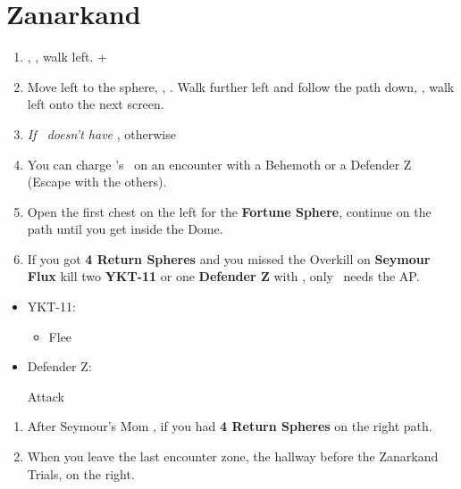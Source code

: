 \chapter{Zanarkand}
\begin{enumerate}
    \item \sd, \cs[0:50], walk left. \fmv+\cs[2:20]
    \item Move left to the sphere, \sd, \cs[1:40]. Walk further left and follow the path down, \cs[3:20], walk left onto the next screen.
    \item \textit{If \rikku\ doesn't have \od} \formation{\tidus}{\auron}{\rikku}, otherwise \formation{\tidus}{\auron}{\kimahri}
    \item You can charge \rikku's \od\ on an encounter with a Behemoth or a Defender Z (Escape with the others).
    \item Open the first chest on the left for the \textbf{Fortune Sphere}, continue on the path until you get inside the Dome.
    \item If you got \textbf{4 Return Spheres} and you missed the Overkill on \textbf{Seymour Flux} kill two \textbf{YKT-11} or one \textbf{Defender Z} with \formation{\tidus}{\auron}{\yuna}, only \yuna\ needs the AP.
\end{enumerate}
\begin{encounters}
    \begin{itemize}
        \item YKT-11:
        \begin{itemize}
            \yunaf Attack
            \tidusf Attack
            \item Flee
        \end{itemize}
        \item Defender Z:
        \begin{itemize}
            \summon{\bahamut}
            \bahamutf Attack
        \end{itemize}
    \end{itemize}
\end{encounters}
\begin{enumerate}[resume]
    \item After Seymour's Mom \cs, if you had \textbf{4 Return Spheres}  on the right path.
    \item When you leave the last encounter zone, the hallway before the Zanarkand Trials,  on the right.
\end{enumerate}
